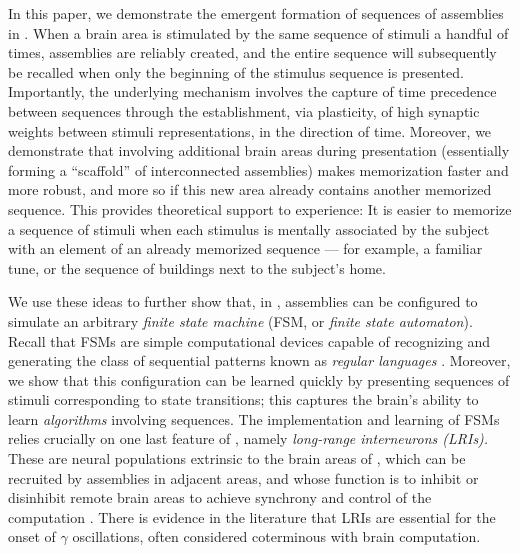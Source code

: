 \documentclass[12pt,nosubfloats]{alt2024} %
\newcommand{\1}{\mathbbm{1}}
\begin{document}
In this paper, we demonstrate the emergent formation of sequences of assemblies in \name. When a brain area is stimulated by the same sequence of stimuli a handful of times, assemblies are reliably created, and the entire sequence will subsequently be recalled when only the beginning of the stimulus sequence is presented. Importantly, the underlying mechanism involves the capture of time precedence between sequences through the establishment, via plasticity, of high synaptic weights between stimuli representations, in the direction of time.  Moreover, we demonstrate that involving additional brain areas during presentation (essentially forming a ``scaffold'' of interconnected assemblies) makes memorization faster and more robust, and more so if this new area already contains another memorized sequence. This provides theoretical support to experience: It is easier to memorize a sequence of stimuli when each stimulus is mentally associated by the subject with an element of an already memorized sequence --- for example, a familiar tune, or the sequence of buildings next to the subject's home.

We use these ideas to further show that, in \name, assemblies can be configured to simulate an arbitrary {\em finite state machine} (FSM, or {\em finite state automaton}). Recall that FSMs are simple computational devices capable of recognizing and generating the class of sequential patterns known as {\em regular languages} \citep{sipser1996introduction}.  Moreover, we show that this configuration can be learned quickly by presenting sequences of stimuli corresponding to state transitions; this captures the brain's ability to learn {\em algorithms} involving sequences. The implementation and learning of FSMs relies crucially on one last feature of \name, namely {\em long-range interneurons (LRIs).} These are neural populations extrinsic to the brain areas of \name, which can be recruited by assemblies in adjacent areas, and whose function is to inhibit or disinhibit remote brain areas to achieve synchrony and control of the computation \citep{sik1995hippocampal, jinno2007neuronal, zhang2014long}.  There is evidence in the literature \cite{roux2015tasks} that LRIs are essential for the onset of $\gamma$ oscillations, often considered coterminous with brain computation.
\end{document}
